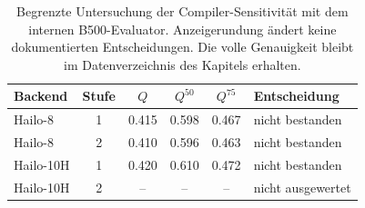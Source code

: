 \begin{table}[H]
\centering\small\TableSetup
\caption{Begrenzte Untersuchung der Compiler-Sensitivität mit dem internen B500-Evaluator. Anzeigerundung ändert keine dokumentierten Entscheidungen. Die volle Genauigkeit bleibt im Datenverzeichnis des Kapitels erhalten.}
\label{tab:evaluation:yolov7_opt_sensitivity}
\begin{tabular}{@{}l c S[table-format=1.3] S[table-format=1.3] S[table-format=1.3] l@{}}
\toprule
Backend & Stufe & {$Q$} & {$Q^{50}$} & {$Q^{75}$} & Entscheidung \\
\midrule
Hailo-8 & 1 & 0.415 & 0.598 & 0.467 & nicht bestanden \\
Hailo-8 & 2 & 0.410 & 0.596 & 0.463 & nicht bestanden \\
Hailo-10H & 1 & 0.420 & 0.610 & 0.472 & nicht bestanden \\
Hailo-10H & 2 & {--} & {--} & {--} & nicht ausgewertet \\
\bottomrule
\end{tabular}
\end{table}
